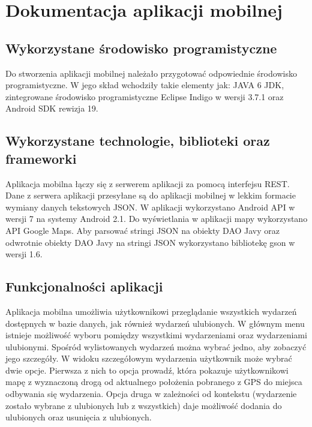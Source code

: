 \documentclass[a4paper]{article}
\begin{document}
\newpage

\section{Dokumentacja aplikacji mobilnej}

\subsection{Wykorzystane środowisko programistyczne}

Do stworzenia aplikacji mobilnej należało przygotować odpowiednie środowisko programistyczne. W jego skład wchodziły takie elementy jak:
JAVA 6 JDK, zintegrowane środowisko programistyczne Eclipse Indigo w wersji 3.7.1 oraz Android SDK rewizja 19.

\subsection{Wykorzystane technologie, biblioteki oraz frameworki}

Aplikacja mobilna łączy się z serwerem aplikacji za pomocą interfejsu REST. Dane z serwera aplikacji przesyłane są do aplikacji mobilnej w lekkim formacie 
wymiany danych tekstowych JSON. W aplikacji wykorzystano Android API w wersji 7 na systemy Android 2.1. Do wyświetlania w aplikacji mapy wykorzystano 
API Google Maps. Aby parsować stringi JSON na obiekty DAO Javy oraz odwrotnie obiekty DAO Javy na stringi JSON wykorzystano bibliotekę gson w wersji 1.6.

\subsection{Funkcjonalności aplikacji}

Aplikacja mobilna umożliwia użytkownikowi przeglądanie wszystkich wydarzeń dostępnych w bazie danych, jak również wydarzeń ulubionych. W głównym menu istnieje możliwość wyboru pomiędzy wszystkimi wydarzeniami oraz wydarzeniami ulubionymi. Spośród wylistowanych wydarzeń można wybrać jedno, aby zobaczyć jego szczegóły. W widoku szczegółowym wydarzenia użytkownik może wybrać dwie opcje. Pierwsza z nich to opcja prowadź, która pokazuje użytkownikowi mapę z wyznaczoną drogą od aktualnego położenia pobranego z GPS do miejsca odbywania się wydarzenia. Opcja druga w zależności od kontekstu (wydarzenie zostało wybrane z ulubionych lub z wszystkich) daje możliwość dodania do ulubionych oraz usunięcia z ulubionych.
\end{document}

